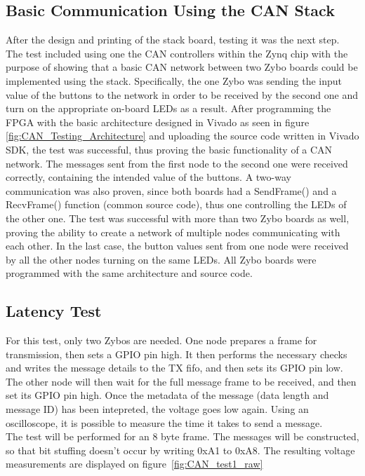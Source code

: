 \subsection{Basic Communication Using the CAN Stack}
\label{sub:TestingCANStack_BareMetal}
After the design and printing of the stack board, testing it was the next step.
The test included using one the CAN controllers within the Zynq chip with the purpose of showing that a basic CAN network between two Zybo boards could be implemented using the stack.
Specifically, the one Zybo was sending the input value of the buttons to the network in order to be received by the second one and turn on the appropriate on-board LEDs as a result.
After programming the FPGA with the basic architecture designed in Vivado as seen in figure \ref{fig:CAN_Testing_Architecture} and uploading the source code written in Vivado SDK, the test was successful, thus proving the basic functionality of a CAN network.
The messages sent from the first node to the second one were received correctly, containing the intended value of the buttons.
A two-way communication was also proven, since both boards had a SendFrame() and a RecvFrame() function (common source code), thus one controlling the LEDs of the other one.
The test was successful with more than two Zybo boards as well, proving the ability to create a network of multiple nodes communicating with each other.
In the last case, the button values sent from one node were received by all the other nodes turning on the same LEDs.
All Zybo boards were programmed with the same architecture and source code.

\subsection{Latency Test}\label{sub:CAN_latency}
For this test, only two Zybos are needed.
One node prepares a frame for transmission, then sets a GPIO pin high.
It then performs the necessary checks and writes the message details to the TX fifo, and then sets its GPIO pin low. \\
The other node will then wait for the full message frame to be received, and then set its GPIO pin high.
Once the metadata of the message (data length and message ID) has been intepreted, the voltage goes low again.
Using an oscilloscope, it is possible to measure the time it takes to send a message.\\

The test will be performed for an 8 byte frame.
The messages will be constructed, so that bit stuffing doesn't occur by writing 0xA1 to 0xA8. 
The resulting voltage measurements are displayed on figure~\ref{fig:CAN_test1_raw}


